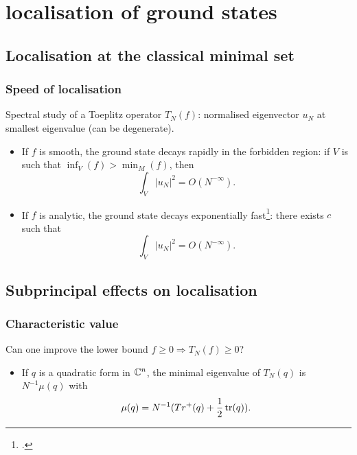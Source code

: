 \documentclass[mathserif]{beamer}
\begin{document}
\section{localisation of ground states}
\subsection{Localisation at the classical minimal set}
\begin{frame}
  \frametitle{Speed of localisation}
  Spectral study of a Toeplitz operator $T_N(f)$: normalised
  eigenvector $u_N$ at smallest eigenvalue (can be degenerate).
  \begin{itemize}
    \item<2->  If $f$ is smooth, the ground state decays
      rapidly in the forbidden region: if $V$ is such that
      $\inf_V(f)>\min_M(f)$, then \[\int_{V}|u_N|^2=O(N^{-\infty}).\]
    \item<3> If $f$ is analytic, the ground state decays exponentially
      fast\footcite{deleporte_toeplitz_2018}: there exists $c$ such that
      \[
        \int_{V}|u_N|^2=O(N^{-\infty}).
      \]\vspace{-1em}
    \end{itemize}
  \end{frame}

\subsection{Subprincipal effects on localisation}
\begin{frame}
  \frametitle{Characteristic value}
  Can one improve the lower bound $f\geq 0\Rightarrow T_N(f)\geq 0$?
  \begin{itemize}
  \item If $q$ is a quadratic form in $\mathbb{C}^n$, the minimal eigenvalue
    of $T_N(q)$ is $N^{-1}\mu(q)$ with $$\mu(q)=N^{-1}(Tr^+(q)+\frac
    12 \operatorname{tr}(q)).$$

\end{itemize}
\end{frame}
\end{document}
